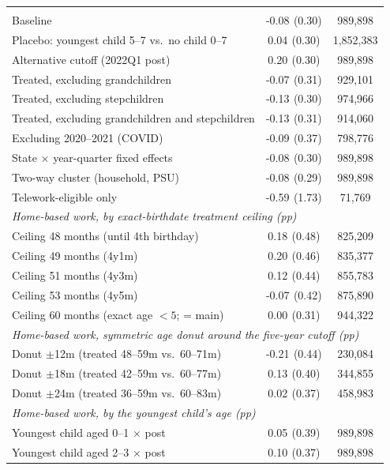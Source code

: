 {\begin{longtable}{lcc}
\endlastfoot
\multicolumn{3}{l}{\textit{Home-based work (pp)}} \\
Baseline & -0.08$^{}$ (0.30) & 989,898 \\
Placebo: youngest child 5--7 vs.\ no child 0--7 & 0.04$^{}$ (0.30) & 1,852,383 \\
Alternative cutoff (2022Q1 post) & 0.20$^{}$ (0.30) & 989,898 \\
Treated, excluding grandchildren & -0.07$^{}$ (0.31) & 929,101 \\
Treated, excluding stepchildren & -0.13$^{}$ (0.30) & 974,966 \\
Treated, excluding grandchildren and stepchildren & -0.13$^{}$ (0.31) & 914,060 \\
Excluding 2020--2021 (COVID) & -0.09$^{}$ (0.37) & 798,776 \\
State $\times$ year-quarter fixed effects & -0.08$^{}$ (0.30) & 989,898 \\
Two-way cluster (household, PSU) & -0.08$^{}$ (0.29) & 989,898 \\
Telework-eligible only & -0.59$^{}$ (1.73) & 71,769 \\
\midrule
\multicolumn{3}{l}{\textit{Home-based work, by exact-birthdate treatment ceiling (pp)}} \\
Ceiling 48 months (until 4th birthday) & 0.18$^{}$ (0.48) & 825,209 \\
Ceiling 49 months (4y1m) & 0.20$^{}$ (0.46) & 835,377 \\
Ceiling 51 months (4y3m) & 0.12$^{}$ (0.44) & 855,783 \\
Ceiling 53 months (4y5m) & -0.07$^{}$ (0.42) & 875,890 \\
Ceiling 60 months (exact age $<5$; = main) & 0.00$^{}$ (0.31) & 944,322 \\
\midrule
\multicolumn{3}{l}{\textit{Home-based work, symmetric age donut around the five-year cutoff (pp)}} \\
Donut $\pm$12m (treated 48--59m vs.\ 60--71m) & -0.21$^{}$ (0.44) & 230,084 \\
Donut $\pm$18m (treated 42--59m vs.\ 60--77m) & 0.13$^{}$ (0.40) & 344,855 \\
Donut $\pm$24m (treated 36--59m vs.\ 60--83m) & 0.02$^{}$ (0.37) & 458,983 \\
\midrule
\multicolumn{3}{l}{\textit{Home-based work, by the youngest child's age (pp)}} \\
Youngest child aged 0--1 $\times$ post & 0.05$^{}$ (0.39) & 989,898 \\
Youngest child aged 2--3 $\times$ post & 0.10$^{}$ (0.37) & 989,898 \\

\end{longtable}}
